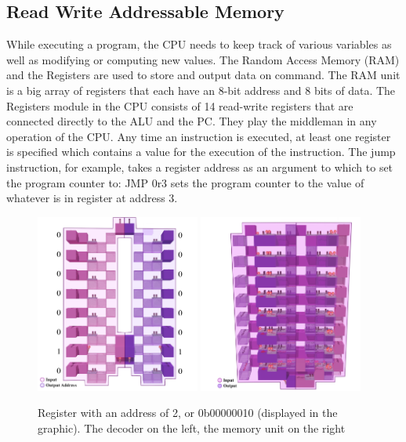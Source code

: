 \subsection{Read Write Addressable Memory}
While executing a program, the CPU needs to keep track of various variables as well as modifying or computing new values. The Random Access Memory (RAM) and the Registers are used to store and output data on command. The RAM unit is a big array of registers that each have an 8-bit address and 8 bits of data. The Registers module in the CPU consists of 14 read-write registers that are connected directly to the ALU and the PC. They play the middleman in any operation of the CPU. Any time an instruction is executed, at least one register is specified which contains a value for the execution of the instruction. The jump instruction, for example, takes a register address as an argument to which to set the program counter to: JMP 0r3 sets the program counter to the value of whatever is in register at address 3.

\begin{figure}[bp!]
    \includegraphics[width=0.48\textwidth]{Figures/MemUnit-small.png}
    \includegraphics[width=0.48\textwidth]{Figures/MemUnit_1-small.png}
    \caption[Register Module]{Register with an address of 2, or 0b00000010 (displayed in the graphic). The decoder on the left, the memory unit on the right}
    \label{fig::MemUnit}
\end{figure}

